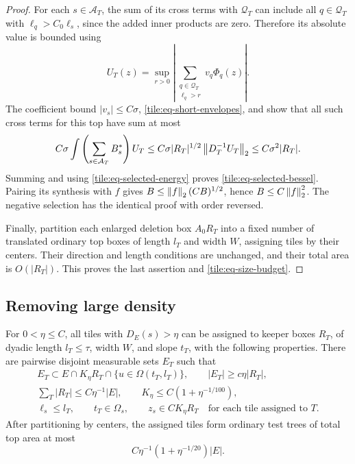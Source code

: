 \begin{proof}
For each \(s\in\mathcal A_T\), the sum of its cross
terms with \(\mathcal Q_T\) can include all
\(q\in\mathcal Q_T\) with \(\ell_q>C_0\ell_s\), since
the added inner products are zero.  Therefore its
absolute value is bounded using
\[
 U_T(z)=\sup_{r>0}
       \left|\sum_{\substack{q\in\mathcal Q_T\\\ell_q>r}}
                    v_q\Phi_q(z)\right|.
\]
The coefficient bound \(|v_s|\leq C\sigma\),
\eqref{tile:eq-short-envelopes}, and
 show that all such cross terms
for this top have sum at most
\[
 C\sigma\int\left(\sum_{s\in\mathcal A_T}B_s^*\right)U_T
 \leq C\sigma |R_T|^{1/2}\left\|D_T^{-1}U_T\right\|_2
 \leq C\sigma^2|R_T|.
\]
Summing and using \eqref{tile:eq-selected-energy}
proves \eqref{tile:eq-selected-bessel}.  Pairing its
synthesis with \(f\) gives
\(B\leq\left\|f\right\|_2(CB)^{1/2}\), hence
\(B\leq C\left\|f\right\|_2^2\).  The negative selection has
the identical proof with order reversed.

Finally, partition each enlarged deletion box
\(A_0R_T\) into a fixed number of translated ordinary
top boxes of length \(l_T\) and width \(W\), assigning
tiles by their centers.  Their direction and length
conditions are unchanged, and their total area is
\(O(|R_T|)\).  This proves the last assertion and
\eqref{tile:eq-size-budget}.
\end{proof}

\subsection{Removing large density}

\begin{lemma}\label{tile:lem-density}
For \(0<\eta\leq C\), all tiles with \(D_E(s)>\eta\)
can be assigned to keeper boxes \(R_T\), of dyadic
length \(l_T\leq\tau\), width \(W\), and slope \(t_T\),
with the following properties.  There are pairwise
disjoint measurable sets \(E_T\) such that
\begin{gather}
 E_T\subset E\cap K_\eta R_T
                 \cap\{u\in\Omega(t_T,l_T)\},\qquad
 |E_T|\geq c\eta|R_T|,
                  \label{tile:eq-density-witnesses}\\
 \sum_T|R_T|\leq C\eta^{-1}|E|,\qquad
 K_\eta\leq C(1+\eta^{-1/100}),
                  \label{tile:eq-keeper-budget}\\
 \ell_s\leq l_T,\qquad t_T\in\Omega_s,\qquad
 z_s\in C K_\eta R_T
 \quad\text{for each tile assigned to }T.
                  \label{tile:eq-density-assignment}
\end{gather}
After partitioning by centers, the assigned tiles form
ordinary test trees of total top area at most
\begin{equation}\label{tile:eq-density-budget}
 C\eta^{-1}(1+\eta^{-1/20})|E|.
\end{equation}
\end{lemma}

